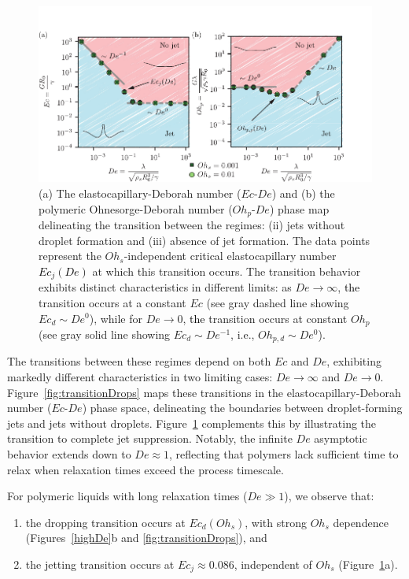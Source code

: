 \documentclass{jfm}
\newcommand{\AO}[1]{{\textcolor{black}{#1}}}
\newcommand{\AKD}[1]{{\textcolor{black}{#1}}}
\newcommand{\oo}{\color{black} \normalfont}
\newcommand{\bb}{\color{black} \normalfont}
\begin{document}
\begin{figure}
	\centering
	\includegraphics[width=\textwidth]{Transtion_08_OnlyJet-eps-converted-to.pdf}
	\caption{(a) The elastocapillary-Deborah number ($Ec$-$De$) and (b) the polymeric Ohnesorge-Deborah number ($Oh_p$-$De$) phase map delineating the transition between the regimes: (ii) jets without droplet formation and (iii) absence of jet formation. The data points represent the $Oh_s$-independent critical elastocapillary number \AO{$Ec_j(De)$} at which this transition occurs. The transition behavior exhibits distinct characteristics in different limits: as $De \to \infty$, \AKD{the} transition occurs at a constant $Ec$ (see gray dashed line showing $Ec_d \sim De^0$), while for $De \to 0$, \AKD{the} transition occurs at constant $Oh_p$ (see gray solid line showing $Ec_d \sim De^{-1}$, i.e., $Oh_{p,d} \sim De^0$).}
	\label{fig:transitionJets}
\end{figure}

\oo
The transitions between these regimes depend on both $Ec$ and $De$, exhibiting markedly different characteristics in two limiting cases: $De \to \infty$ and $De \to 0$.
Figure~\ref{fig:transitionDrops} maps these transitions in the elastocapillary-Deborah number ($Ec$-$De$) phase space, delineating the boundaries between droplet-forming jets and jets without droplets. Figure~\ref{fig:transitionJets} complements this by illustrating the transition to complete jet suppression. Notably, the infinite $De$ asymptotic behavior extends down to $De \approx 1$, reflecting that polymers lack sufficient time to relax when relaxation times exceed the process timescale.
\bb

For polymeric liquids with long relaxation times ($De \gg 1$), we observe that:

\begin{enumerate}
	\item the dropping transition occurs at $Ec_d(Oh_s)$, with strong $Oh_s$ dependence (Figures~\ref{highDe}b and \ref{fig:transitionDrops}), and
	\item the jetting transition occurs at $Ec_j \approx 0.086$, independent of $Oh_s$ (Figure~\ref{fig:transitionJets}a).
\end{enumerate}
\end{document}
